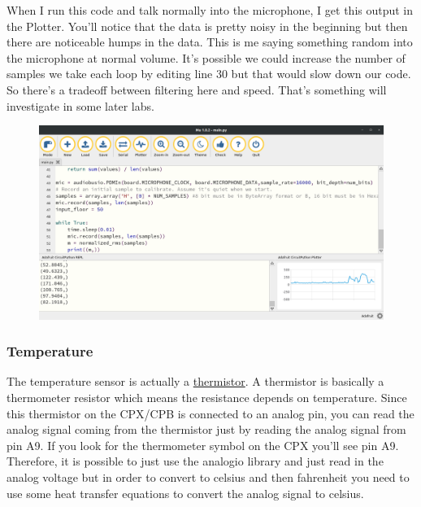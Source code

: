 {\begin{figure}[H]
\begin{center}
  \end{center}
\end{figure}
When I run this code and talk normally into the microphone, I get this
output in the Plotter. You’ll notice that the data is pretty noisy in
the beginning but then there are noticeable humps in the data. This is me saying something random into the microphone at normal volume. It’s possible we could increase the number of samples we take each loop by editing line 30 but that would slow down our code. So there’s a tradeoff between filtering here and speed. That’s
something will investigate in some later labs. 
\begin{figure}[H]
  \begin{center}
    \includegraphics[width=\textwidth]{Figures/sound_mu.png}
  \end{center}
\end{figure}
\subsubsection{Temperature}
The temperature sensor is actually
a \href{https://en.wikipedia.org/wiki/Thermistor}{thermistor}. A
thermistor is basically a thermometer resistor which means the
resistance depends on temperature. Since this thermistor on the CPX/CPB is connected to an analog pin, you can read the analog signal coming from the thermistor just by reading the analog signal from pin A9. If you look for the thermometer symbol on the CPX
you’ll see pin A9. Therefore, it is possible to just use the analogio
library and just read in the analog voltage but in order to convert to
celsius and then fahrenheit you need to use some heat transfer
equations to convert the analog signal to celsius.

}
